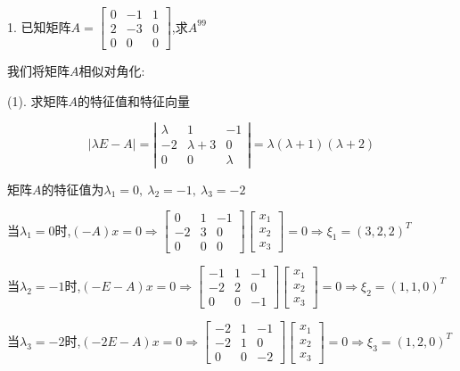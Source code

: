 1. 已知矩阵$A=\left[ \begin{matrix}
	0&-1&1\\
	2&-3&0\\
	0&0&0
\end{matrix}\right] $,求$A^{99}$
\begin{solution}
	
	我们将矩阵$A$相似对角化: 
	
	(1). 求矩阵$A$的特征值和特征向量
	
	$$\left| \lambda E-A\right|=\left| \begin{matrix}
		\lambda&1&-1\\-2&\lambda+3&0\\
		0&0&\lambda
	\end{matrix}\right|=\lambda(\lambda+1)(\lambda+2)$$
	
	矩阵$A$的特征值为$\lambda_{1}=0,\ \lambda_{2}=-1,\ \lambda_{3}=-2$
	
	当$\lambda_{1}=0$时,$(-A)x=0\Rightarrow \left[ \begin{matrix}
		0&1&-1\\
		-2&3&0\\
		0&0&0
	\end{matrix}\right]\left[ \begin{matrix}
		x_{1}\\x_{2}\\x_{3}
	\end{matrix}\right]=0\Rightarrow \xi_{1}=(3,2,2)^T$
	
	当$\lambda_{2}=-1$时,$(-E-A)x=0\Rightarrow \left[ \begin{matrix}
		-1&1&-1\\
		-2&2&0\\
		0&0&-1
	\end{matrix}\right]\left[ \begin{matrix}
		x_{1}\\x_{2}\\x_{3}
	\end{matrix}\right]=0\Rightarrow \xi_{2}=(1,1,0)^T$
	
	当$\lambda_{3}=-2$时,$(-2E-A)x=0\Rightarrow \left[ \begin{matrix}
		-2&1&-1\\
		-2&1&0\\
		0&0&-2
	\end{matrix}\right]\left[ \begin{matrix}
		x_{1}\\x_{2}\\x_{3}
	\end{matrix}\right]=0\Rightarrow \xi_{3}=(1,2,0)^T$
	

\end{solution}
